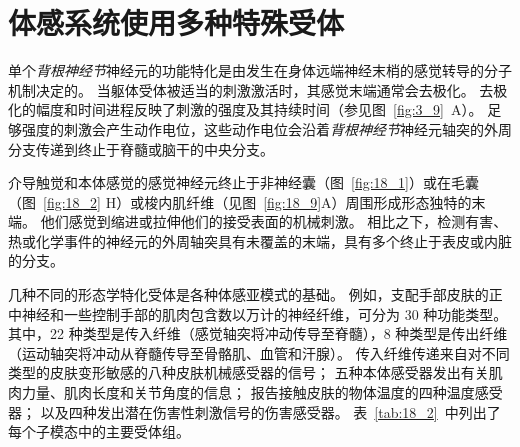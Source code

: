 \section{体感系统使用多种特殊受体}

单个\textit{背根神经节}神经元的功能特化是由发生在身体远端神经末梢的感觉转导的分子机制决定的。
当躯体受体被适当的刺激激活时，其感觉末端通常会去极化。
去极化的幅度和时间进程反映了刺激的强度及其持续时间（参见图~\ref{fig:3_9}~A）。 
足够强度的刺激会产生动作电位，这些动作电位会沿着\textit{背根神经节}神经元轴突的外周分支传递到终止于脊髓或脑干的中央分支。


介导触觉和本体感觉的感觉神经元终止于非神经囊（图~\ref{fig:18_1}）或在毛囊（图~\ref{fig:18_2} H）或梭内肌纤维（见图~\ref{fig:18_9}A）周围形成形态独特的末端。
他们感觉到缩进或拉伸他们的接受表面的机械刺激。
相比之下，检测有害、热或化学事件的神经元的外周轴突具有未覆盖的末端，具有多个终止于表皮或内脏的分支。


几种不同的形态学特化受体是各种体感亚模式的基础。
例如，支配手部皮肤的正中神经和一些控制手部的肌肉包含数以万计的神经纤维，可分为 30 种功能类型。
其中，22 种类型是传入纤维（感觉轴突将冲动传导至脊髓），8 种类型是传出纤维（运动轴突将冲动从脊髓传导至骨骼肌、血管和汗腺）。
传入纤维传递来自对不同类型的皮肤变形敏感的八种皮肤机械感受器的信号；
五种本体感受器发出有关肌肉力量、肌肉长度和关节角度的信息；
报告接触皮肤的物体温度的四种温度感受器；
以及四种发出潜在伤害性刺激信号的伤害感受器。
表~\ref{tab:18_2}~中列出了每个子模态中的主要受体组。


